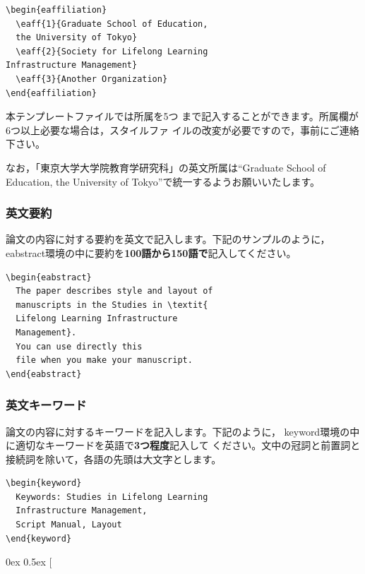 \documentclass[b5paper,10pt,twocolumn,tombow]{jarticle}
\begin{document}
\begin{verbatim}
\begin{eaffiliation}
  \eaff{1}{Graduate School of Education,
  the University of Tokyo}
  \eaff{2}{Society for Lifelong Learning
Infrastructure Management}
  \eaff{3}{Another Organization}
\end{eaffiliation}
\end{verbatim}
本テンプレートファイルでは所属を5つ
まで記入することができます。所属欄が6つ以上必要な場合は，スタイルファ
イルの改変が必要ですので，事前にご連絡下さい。

なお，「東京大学大学院教育学研究科」の英文所属は``Graduate School of
Education, the University of
Tokyo''で統一するようお願いいたします。

\subsubsection{英文要約}
論文の内容に対する要約を英文で記入します。下記のサンプルのように，
eabstract環境の中に要約を\textbf{100語から150語で}記入してください。


\begin{verbatim}
\begin{eabstract}
  The paper describes style and layout of
  manuscripts in the Studies in \textit{
  Lifelong Learning Infrastructure
  Management}.
  You can use directly this
  file when you make your manuscript.
\end{eabstract}
\end{verbatim}


\subsubsection{英文キーワード}
論文の内容に対するキーワードを記入します。下記のように，
keyword環境の中に適切なキーワードを英語で\textbf{3つ程度}記入して
ください。文中の冠詞と前置詞と接続詞を除いて，各語の先頭は大文字とします。

\begin{verbatim}
\begin{keyword}
  Keywords: Studies in Lifelong Learning
  Infrastructure Management,
  Script Manual, Layout
\end{keyword}
\end{verbatim}


\begingroup \parindent 0ex \parskip 0.5ex \def\ennotesize{\normalsize}
\theendnotes \endgroup
\newpage
\twocolumn[
\end{document}
